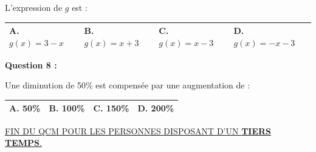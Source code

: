 \documentclass[12pt,a4paper]{exam}
\begin{document}
L'expression de $g$ est :

\begin{center}
    \renewcommand{\arraystretch}{3}
    \begin{tabular}{|m{3.4cm}|m{3.4cm}|m{3.9cm}|m{3.4cm}|}
    \hline
    \centering \vspace{-0.3cm} \textbf{A.} $g(x) = 3 - x$ & 
    \centering \vspace{-0.3cm} \textbf{B.} $g(x) = x + 3$ & 
    \centering \vspace{-0.3cm} \textbf{C.} $g(x) = x - 3$ & 
    \centering \vspace{-0.3cm} \textbf{D.} $g(x) = -x -3$ \tabularnewline
    \hline
    \end{tabular}
\end{center}

\vspace{10pt}

\textbf{Question 8 :}
\vspace{5pt}

Une diminution de 50\% est compensée par une augmentation de : 

\begin{center}
    \renewcommand{\arraystretch}{3}
    \begin{tabular}{|m{3.4cm}|m{3.4cm}|m{3.9cm}|m{3.4cm}|}
    \hline
    \centering \vspace{-0.3cm} \textbf{A.} 50\% & 
    \centering \vspace{-0.3cm} \textbf{B.} 100\% & 
    \centering \vspace{-0.3cm} \textbf{C.} 150\% & 
    \centering \vspace{-0.3cm} \textbf{D.} 200\% \tabularnewline
    \hline
    \end{tabular}
\end{center}

\vspace{10pt}

\begin{center}
    \underline{FIN DU QCM POUR LES PERSONNES DISPOSANT D'UN \textbf{TIERS TEMPS}.}

    
\end{center}

\vspace{10pt}
\end{document}

